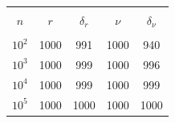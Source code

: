 \begin{table}




{\small %


\begin{center}


\parbox{260pt}{


}





\vspace*{2ex}





\tabcolsep=15pt


\begin{tabular}{|c|c|c|c|c|}


\hline


&&&&\\[-9pt]


$n$ & $r$& ${\delta}_r$& $\nu$& $\delta_\nu$\\[2pt]


\hline


&&&&\\[-9pt]


$10^2$& 1000& 991& 1000& 940\\


$10^3$& 1000& 999& 1000& 996\\


$10^4$& 1000& 999& 1000& 999\\


$10^5$& 1000& 1000\hphantom{9}& 1000& 1000\hphantom{9}\\


\hline


\end{tabular}


\end{center}


}




\vspace*{9pt}


\begin{minipage}[t]{63mm}


{\small %


}
\end{minipage}
\end{table}
